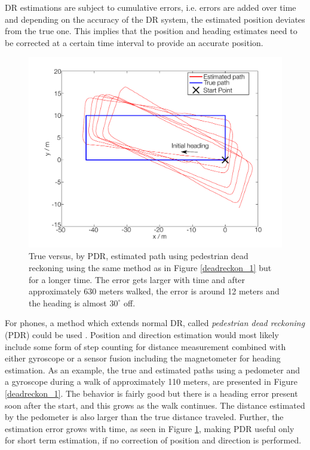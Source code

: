 \documentclass{LTHthesis}
\begin{document}
DR estimations are subject to cumulative errors, i.e. errors are added over time and depending on the accuracy of the DR system, the estimated position deviates from the true one. This implies that the position and heading estimates need to be corrected at a certain time interval to provide an accurate position.
%
\begin{figure}[!hbt]

\includegraphics[width=1\textwidth ]{images/kinematic/deadreckon_2}
\caption{True versus, by PDR, estimated path using pedestrian dead reckoning using the same method as in Figure \ref{deadreckon_1} but for a longer time. The error gets larger with time and after approximately 630 meters walked, the error is around 12 meters and the heading is almost $30^\circ$ off.}\label{deadreckon_2}
\end{figure}
%
For phones, a method which extends normal DR, called \emph{pedestrian dead reckoning} (PDR) could be used \cite{ped_dead}. Position and direction estimation would most likely include some form of step counting for distance measurement combined with either gyroscope or a sensor fusion including the magnetometer for heading estimation. As an example, the true and estimated paths using a pedometer and a gyroscope during a walk of approximately 110 meters, are presented in Figure \ref{deadreckon_1}. The behavior is fairly good but there is a heading error present soon after the start, and this grows as the walk continues. The distance estimated by the pedometer is also larger than the true distance traveled. Further, the estimation error grows with time, as seen in Figure \ref{deadreckon_2}, making PDR useful only for short term estimation, if no correction of position and direction is performed.  
%
\end{document}
